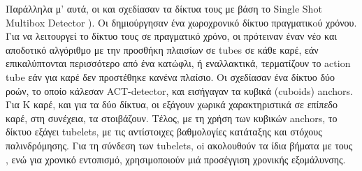 Παράλληλα μ' αυτά, οι \en \cite{singh2016online} \gr και \en\cite{kalogeiton17iccv:hal-01519812} \gr  σχεδίασαν τα δίκτυα τους
με βάση το \en Single Shot Multibox Detector \cite{DBLP:journals/corr/LiuAESR15})\gr. Οι \en\cite{singh2016online} \gr δημιούργησαν
ένα  χωροχρονικό δίκτυο  πραγματικoύ χρόνου. Για να λειτουργεί το δίκτυο τους σε πραγματικό χρόνο, οι \en  \cite{singh2016online} \gr πρότειναν έναν νέο και αποδοτικό
αλγόριθμο με την προσθήκη πλαισίων σε \en tubes \gr σε κάθε καρέ, εάν επικαλύπτονται περισσότερο από ένα κατώφλι, ή  εναλλακτικά, τερματίζουν  το \en action tube \gr εάν για  καρέ
δεν προστέθηκε κανένα πλαίσιο. Οι \en\cite{kalogeiton17iccv:hal-01519812} \gr  σχεδίασαν ένα δίκτυο δύο ροών, το οποίο κάλεσαν
\en ACT-detector\gr, και εισήγαγαν τα κυβικά (\en cuboids) anchors\gr. Για K καρέ, και για τα δύο δίκτυα,
οι \en \cite{kalogeiton17iccv:hal-01519812} \gr εξάγουν  χωρικά χαρακτηριστικά σε επίπεδο καρέ, στη συνέχεια, τα στοιβάζουν.
Τέλος, με τη χρήση των κυβικών \en anchors\gr, το δίκτυο  εξάγει \en tubelets\gr,
με τις αντίστοιχες βαθμολογίες κατάταξης και στόχους παλινδρόμησης. Για τη σύνδεση των \en tubelets\gr, oi \en \cite{kalogeiton17iccv:hal-01519812} \gr  ακολουθούν 
τα ίδια βήματα με τους \en \cite{singh2016online}\gr, ενώ για χρονικό εντοπισμό, χρησιμοποιούν μιά προσέγγιση χρονικής εξομάλυνσης. \par


